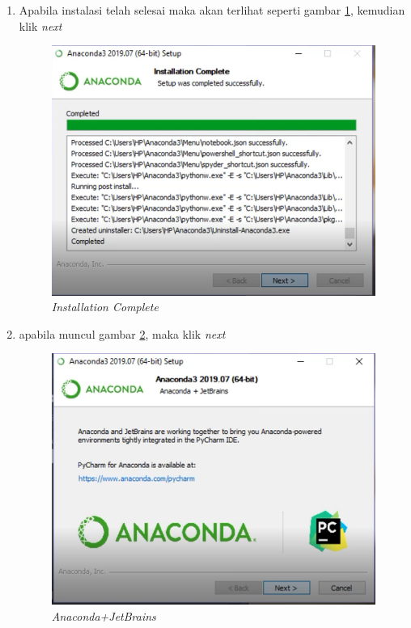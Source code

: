 \begin{enumerate}
\item Apabila instalasi telah selesai  maka akan terlihat seperti gambar \ref{Figureanaconda8}, kemudian klik \textit{next}
\begin{figure}[H]
    \centering
    \includegraphics[scale=0.75]{figures/9}
    \caption{\textit{Installation Complete}}
    \label{Figureanaconda8}
\end{figure}

\item apabila muncul gambar \ref{Figureanaconda70}, maka klik \textit{next}
\begin{figure}[H]
    \centering
    \includegraphics[scale=0.75]{figures/10}
    \caption{\textit{Anaconda+JetBrains}}
    \label{Figureanaconda70}
\end{figure}


\end{enumerate}

